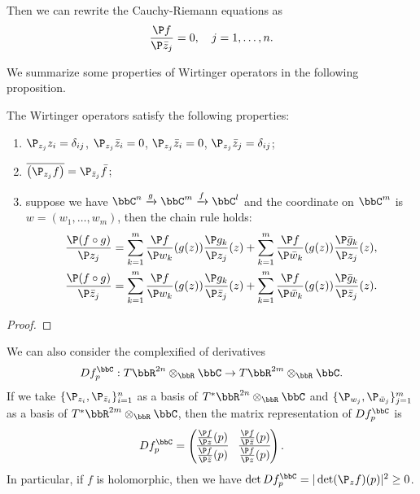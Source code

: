     Then we can rewrite the Cauchy-Riemann equations as
    \[ \frac{\P f}{\P \bar{z}_j} = 0, \quad j = 1, \ldots, n. \]

    We summarize some properties of Wirtinger operators in the following proposition.
    \begin{proposition}\label{prop:properties_of_Wirtinger_operators}
        The Wirtinger operators satisfy the following properties:
        \begin{enumerate}
            \item \(\P_{z_j} z_i = \delta_{ij}\), \(\P_{z_j} \bar{z}_i = 0\), \(\P_{z_j} \bar{z}_i = 0\), \(\P_{z_j} \bar{z}_j = \delta_{ij}\);
            \item \(\overline{\left( \P_{z_j} f \right)} = \P_{\bar{z}_j} \bar{f}\);
            \item suppose we have \(\bbC^n \xrightarrow{g} \bbC^m \xrightarrow{f} \bbC^l\) and the coordinate on \(\bbC^m\) is \(w = (w_1, \ldots, w_m)\), then the chain rule holds:
                \begin{align*}
                    \frac{\P (f \circ g)}{\P z_j} &= \sum_{k=1}^m \frac{\P f}{\P w_k}(g(z)) \frac{\P g_k}{\P z_j}(z) + \sum_{k=1}^m \frac{\P f}{\P \bar{w}_k}(g(z)) \frac{\P \bar{g}_k}{\P z_j}(z), \\
                    \frac{\P (f \circ g)}{\P \bar{z}_j} &= \sum_{k=1}^m \frac{\P f}{\P w_k}(g(z)) \frac{\P g_k}{\P \bar{z}_j}(z) + \sum_{k=1}^m \frac{\P f}{\P \bar{w}_k}(g(z)) \frac{\P \bar{g}_k}{\P \bar{z}_j}(z).
                \end{align*}
        \end{enumerate}
    \end{proposition}
    \begin{proof}
    \end{proof}

    We can also consider the complexified of derivatives
    \[ Df_p^\bbC: T\bbR^{2n} \otimes_\bbR \bbC \to T\bbR^{2m} \otimes_\bbR \bbC. \]
    If we take \(\{\P_{z_i}, \P_{\bar{z}_i}\}_{i=1}^n\) as a basis of \(T^*\bbR^{2n} \otimes_\bbR \bbC\) and \(\{\P_{w_j}, \P_{\bar{w}_j}\}_{j=1}^m\) as a basis of \(T^*\bbR^{2m} \otimes_\bbR \bbC\), 
    then the matrix representation of \(Df_p^\bbC\) is
    \[ Df_p^\bbC = \begin{pmatrix}
        \frac{\P f}{\P z}(p) & \frac{\P f}{\P \bar{z}}(p) \\
        \overline{\frac{\P f}{\P \bar{z}}(p)} & \overline{\frac{\P f}{\P z}(p)}
    \end{pmatrix}. \]
    In particular, if \(f\) is holomorphic, then we have \(\det Df_p^\bbC = |\det(\P_z f)(p)|^2 \geq 0\).

